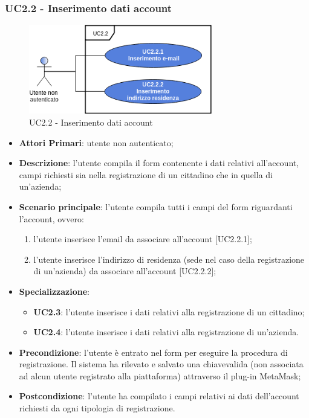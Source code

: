 \subsubsection{UC2.2 - Inserimento dati account}
\begin{figure}[h]
	\includegraphics[width=8cm]{res/images/UC2-2RegistrazioneGenerale.png}
	\centering
	\caption{UC2.2 - Inserimento dati account}
\end{figure}
\begin{itemize}
	\item \textbf{Attori Primari}: utente non autenticato;
	\item \textbf{Descrizione}: l'utente compila il form contenente i dati relativi all'account, campi richiesti sia nella registrazione di un cittadino che in quella di un'azienda;
	\item \textbf{Scenario principale}: l'utente compila tutti i campi del form riguardanti l'account, ovvero:
	\begin{enumerate}[label=\alph*.]
		\item l'utente inserisce l'email da associare all'account [UC2.2.1];
		\item l'utente inserisce l'indirizzo di residenza (sede nel caso della registrazione di un'azienda) da associare all'account [UC2.2.2];
	\end{enumerate}
	\item \textbf{Specializzazione}:
	\begin{itemize}
		\item \textbf{UC2.3}: l'utente inserisce i dati relativi alla registrazione di un cittadino;
		\item \textbf{UC2.4}: l'utente inserisce i dati relativi alla registrazione di un'azienda.
		
	\end{itemize}
	\item \textbf{Precondizione}: l'utente è entrato nel form per eseguire la procedura di registrazione. Il sistema ha rilevato e salvato una chiave\glosp valida (non associata ad alcun utente registrato alla piattaforma) attraverso il plug-in MetaMask\glo;
	\item \textbf{Postcondizione}: l'utente ha compilato i campi relativi ai dati dell'account richiesti da ogni tipologia di registrazione.
	
\end{itemize}
